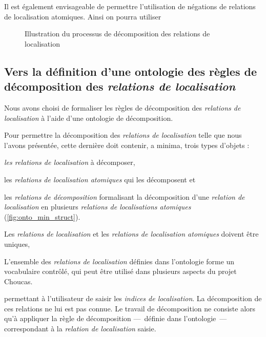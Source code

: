 
Il est également envisageable de permettre l'utilisation de négations
de relations de localisation atomiques. Ainsi on pourra utiliser

\begin{figure}
  \centering
  \missingfigure{}
  \caption{Illustration du processus de décomposition des relations de
  localisation}
  \label{fig:logique_dec}
\end{figure}

\subsection{Vers la définition d'une ontologie des règles de
  décomposition des \emph{relations de localisation}}

Nous avons choisi de formaliser les règles de décomposition des
\emph{relations de localisation} à l'aide d'une ontologie de
décomposition.

Pour permettre la décomposition des \emph{relations de localisation}
telle que nous l'avons présentée, cette dernière doit contenir, a
minima, trois types d'objets :
%
\begin{enumerate*}[label=(\alph*)]
\item \emph{les relations de localisation} à décomposer,
\item les \emph{relations de localisation atomiques} qui les
  décomposent et
\item les \emph{relations de décomposition} formalisant la
  décomposition d'une \emph{relation de localisation} en plusieurs
  \emph{relations de localisations atomiques}
  (\autoref{fig:onto_min_struct}).
\end{enumerate*}
%
Les \emph{relations de localisation} et les \emph{relations de
  localisation atomiques} doivent être uniques, 

L'ensemble des \emph{relations de localisation} définies dans
l'ontologie forme un vocabulaire contrôlé, qui peut être utilisé dans
plusieurs aspects du projet Choucas. 



permettant à l'utilisateur
de saisir les \emph{indices de localisation}. La décomposition de ces
relations ne lui est pas connue. Le travail de décomposition ne
consiste alors qu'à appliquer la règle de décomposition ---~définie
dans l'ontologie~--- correspondant à la \emph{relation de
  localisation} saisie.

